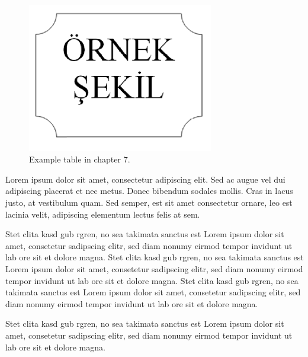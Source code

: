 \begin{figure}
	\centering
	\includegraphics[width=230pt,keepaspectratio=true]{./fig/sekil7}
	\caption{Example table in chapter 7.}
	\label{Figure7.1}
\end{figure}

Lorem ipsum dolor sit amet, consectetur adipiscing elit. Sed ac augue vel dui adipiscing placerat et nec metus. Donec bibendum sodales mollis. Cras in lacus justo, at vestibulum quam. Sed semper, est sit amet consectetur ornare, leo est lacinia velit, adipiscing elementum lectus felis at sem.

Stet clita kasd gub rgren, no sea takimata sanctus est Lorem ipsum dolor sit amet, consetetur sadipscing elitr, sed diam nonumy eirmod tempor invidunt ut lab ore sit et dolore magna. Stet clita kasd gub rgren, no sea takimata sanctus est Lorem ipsum dolor sit amet, consetetur sadipscing elitr, sed diam nonumy eirmod tempor invidunt ut lab ore sit et dolore magna. Stet clita kasd gub rgren, no sea takimata sanctus est Lorem ipsum dolor sit amet, consetetur sadipscing elitr, sed diam nonumy eirmod tempor invidunt ut lab ore sit et dolore magna. 

Stet clita kasd gub rgren, no sea takimata sanctus est Lorem ipsum dolor sit amet, consetetur sadipscing elitr, sed diam nonumy eirmod tempor invidunt ut lab ore sit et dolore magna. 
